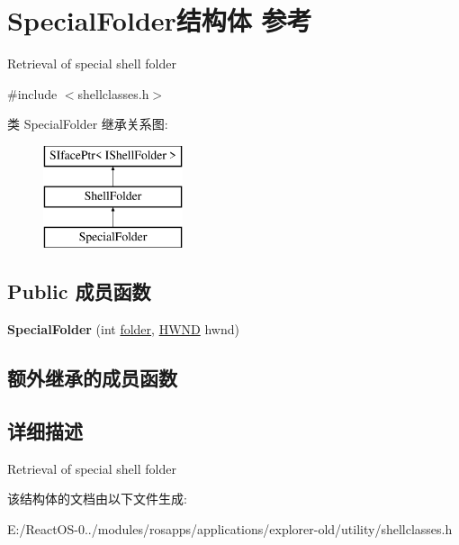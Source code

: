 \hypertarget{struct_special_folder}{}\section{Special\+Folder结构体 参考}
\label{struct_special_folder}


Retrieval of special shell folder  




{\ttfamily \#include $<$shellclasses.\+h$>$}

类 Special\+Folder 继承关系图\+:\begin{figure}[H]
\begin{center}
\leavevmode
\includegraphics[height=3.000000cm]{struct_special_folder}
\end{center}
\end{figure}
\subsection*{Public 成员函数}
\begin{DoxyCompactItemize}
\item 
\mbox{\label{struct_special_folder_a59dade875e88a11ad63a60be30e40e64}} 
{\bfseries Special\+Folder} (int \hyperlink{structfolder}{folder}, \hyperlink{interfacevoid}{H\+W\+ND} hwnd)
\end{DoxyCompactItemize}
\subsection*{额外继承的成员函数}


\subsection{详细描述}
Retrieval of special shell folder 

该结构体的文档由以下文件生成\+:\begin{DoxyCompactItemize}
\item 
E\+:/\+React\+O\+S-\/0../modules/rosapps/applications/explorer-\/old/utility/shellclasses.\+h\end{DoxyCompactItemize}

